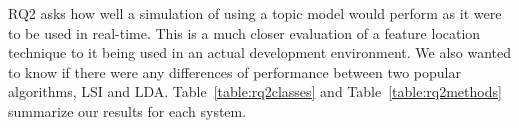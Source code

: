 RQ2 asks how well a simulation of using a topic model would perform as
it were to be used in real-time.
This is a much closer evaluation of a feature location technique to it
being used in an actual development environment.
We also wanted to know if there were any differences of performance
between two popular algorithms, LSI and LDA.
Table~\ref{table:rq2classes} and Table~\ref{table:rq2methods}
summarize our results for each system.

